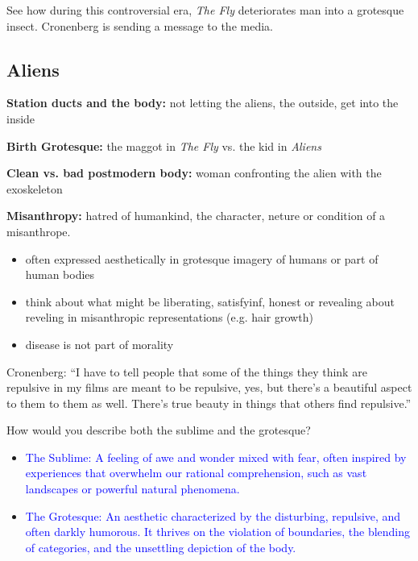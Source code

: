\documentclass[11pt,fleqn]{book} %
\begin{document}
\begin{remark}
    See how during this controversial era, \textit{The Fly} deteriorates man into a grotesque insect. Cronenberg is sending a message to the media.
\end{remark}

\subsection{Aliens}
\textbf{Station ducts and the body:} not letting the aliens, the outside, get into the inside


\textbf{Birth Grotesque:} the maggot in \textit{The Fly} vs. the kid in \textit{Aliens}

\textbf{Clean vs. bad postmodern body:} woman confronting the alien with the exoskeleton

\textbf{Misanthropy:} hatred of humankind, the character, neture or condition of a misanthrope.
\begin{itemize}
    \item often expressed aesthetically in grotesque imagery of humans or part of human bodies
    \item think about what might be liberating, satisfyinf, honest or revealing about reveling in misanthropic representations (e.g. hair growth)
    \item disease is not part of morality
\end{itemize}

Cronenberg: \enquote{I have to tell people
that some of the things
they think are repulsive
in my films are meant to
be repulsive, yes, but
there’s a beautiful
aspect to them to them
as well. There’s true
beauty in things that
others find repulsive.}

\begin{exercise}
How would you describe both the sublime and the grotesque?
\begin{itemize}
\item \textcolor{blue}{The Sublime:  A feeling of awe and wonder mixed with fear, often inspired by experiences that overwhelm our rational comprehension, such as vast landscapes or powerful natural phenomena.}
\item \textcolor{blue}{The Grotesque: An aesthetic characterized by the disturbing, repulsive, and often darkly humorous. It thrives on the violation of boundaries, the blending of categories, and the unsettling  depiction of the body.}
\end{itemize}
\end{exercise}
\end{document}
